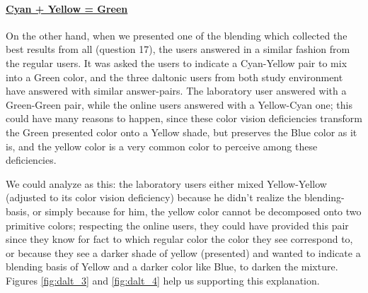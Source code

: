 \paragraph{\ul{Cyan + Yellow = Green}}
%
On the other hand, when we presented one of the blending which collected the best results from all (question 17), the users answered in a similar fashion from the regular users. It was asked the users to indicate a Cyan-Yellow pair to mix into a Green color, and the three daltonic users from both study environment have
answered with similar answer-pairs. The laboratory user answered with a Green-Green pair, while the online users answered with a Yellow-Cyan one; this could have many reasons to happen, since these color vision deficiencies transform the Green presented color onto a Yellow shade, but preserves the Blue color as it is, and
the yellow color is a very common color to perceive among these deficiencies. \par
%
We could analyze as this: the laboratory users either mixed Yellow-Yellow (adjusted to its color vision deficiency) because he didn't realize the blending-basis, or simply because for him, the yellow color cannot be decomposed onto two primitive colors; respecting the online users, they could have provided this
pair since they know for fact to which regular color the color they see correspond to, or because they see a darker shade of yellow (presented) and wanted to indicate a blending basis of Yellow and a darker color like Blue, to darken the mixture. Figures \ref{fig:dalt_3} and \ref{fig:dalt_4} help us supporting this explanation.
%
